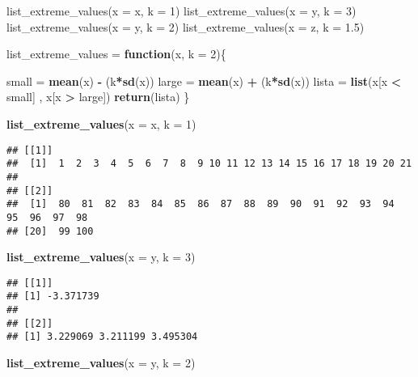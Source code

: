 \documentclass[]{article}
\newenvironment{Shaded}{\begin{snugshade}}{\end{snugshade}}
\newcommand{\ControlFlowTok}[1]{\textcolor[rgb]{0.13,0.29,0.53}{\textbf{#1}}}
\newcommand{\DataTypeTok}[1]{\textcolor[rgb]{0.13,0.29,0.53}{#1}}
\newcommand{\DecValTok}[1]{\textcolor[rgb]{0.00,0.00,0.81}{#1}}
\newcommand{\KeywordTok}[1]{\textcolor[rgb]{0.13,0.29,0.53}{\textbf{#1}}}
\newcommand{\NormalTok}[1]{#1}
\newcommand{\OperatorTok}[1]{\textcolor[rgb]{0.81,0.36,0.00}{\textbf{#1}}}
\newcommand{\StringTok}[1]{\textcolor[rgb]{0.31,0.60,0.02}{#1}}
\begin{document}
list\_extreme\_values(x = x, k = 1) list\_extreme\_values(x = y, k = 3)
list\_extreme\_values(x = y, k = 2) list\_extreme\_values(x = z, k =
1.5)

\begin{Shaded}
\begin{Highlighting}[]
\NormalTok{list_extreme_values =}\StringTok{ }\ControlFlowTok{function}\NormalTok{(x, }\DataTypeTok{k =} \DecValTok{2}\NormalTok{)\{}
  
\NormalTok{  small =}\StringTok{ }\KeywordTok{mean}\NormalTok{(x) }\OperatorTok{-}\StringTok{ }\NormalTok{(k}\OperatorTok{*}\KeywordTok{sd}\NormalTok{(x)) }
\NormalTok{  large =}\StringTok{ }\KeywordTok{mean}\NormalTok{(x) }\OperatorTok{+}\StringTok{ }\NormalTok{(k}\OperatorTok{*}\KeywordTok{sd}\NormalTok{(x)) }
\NormalTok{  lista =}\StringTok{ }\KeywordTok{list}\NormalTok{(x[x }\OperatorTok{<}\StringTok{ }\NormalTok{small] , x[x }\OperatorTok{>}\StringTok{ }\NormalTok{large])}
  \KeywordTok{return}\NormalTok{(lista)}
\NormalTok{\}}

\KeywordTok{list_extreme_values}\NormalTok{(}\DataTypeTok{x =}\NormalTok{ x, }\DataTypeTok{k =} \DecValTok{1}\NormalTok{)}
\end{Highlighting}
\end{Shaded}

\begin{verbatim}
## [[1]]
##  [1]  1  2  3  4  5  6  7  8  9 10 11 12 13 14 15 16 17 18 19 20 21
## 
## [[2]]
##  [1]  80  81  82  83  84  85  86  87  88  89  90  91  92  93  94  95  96  97  98
## [20]  99 100
\end{verbatim}

\begin{Shaded}
\begin{Highlighting}[]
\KeywordTok{list_extreme_values}\NormalTok{(}\DataTypeTok{x =}\NormalTok{ y, }\DataTypeTok{k =} \DecValTok{3}\NormalTok{)}
\end{Highlighting}
\end{Shaded}

\begin{verbatim}
## [[1]]
## [1] -3.371739
## 
## [[2]]
## [1] 3.229069 3.211199 3.495304
\end{verbatim}

\begin{Shaded}
\begin{Highlighting}[]
\KeywordTok{list_extreme_values}\NormalTok{(}\DataTypeTok{x =}\NormalTok{ y, }\DataTypeTok{k =} \DecValTok{2}\NormalTok{)}
\end{Highlighting}
\end{Shaded}
\end{document}
